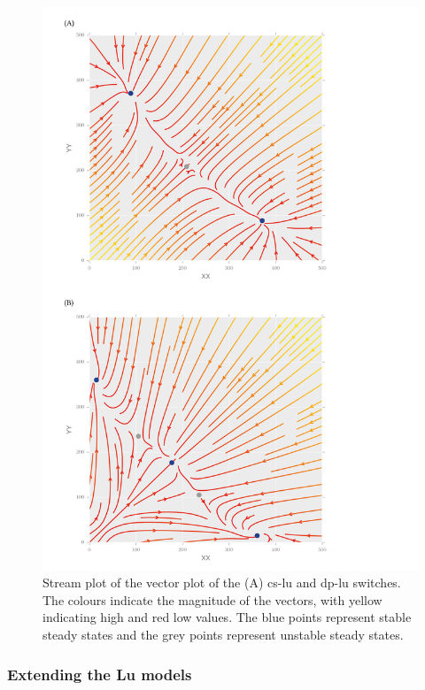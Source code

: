 \begin{figure}[htbp]
\begin{center}
	\includegraphics[scale=0.5]{../../chapters/chapterStabilityFinder/images/lu_bifurc.png}
	\caption[LoF caption]{\label{fig:lu_bifurc}  Stream plot of the vector plot of the (A) \acrshort{cs-lu} and \acrshort{dp-lu} switches. The colours indicate the magnitude of the vectors, with yellow indicating high and red low values. The blue points represent stable steady states and the grey points represent unstable steady states.  }
\end{center}
\end{figure}
\clearpage
 
\subsubsection{Extending the Lu models}

